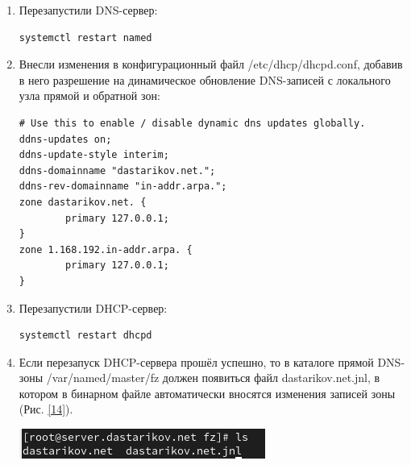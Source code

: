 \begin{enumerate}
\item Перезапустили DNS-сервер:
    \begin{verbatim}
systemctl restart named
    \end{verbatim}
\item Внесли изменения в конфигурационный файл /etc/dhcp/dhcpd.conf, добавив в него разрешение на динамическое обновление DNS-записей с локального узла прямой и обратной зон:
    \begin{verbatim}
# Use this to enable / disable dynamic dns updates globally.
ddns-updates on;
ddns-update-style interim;
ddns-domainname "dastarikov.net.";
ddns-rev-domainname "in-addr.arpa.";
zone dastarikov.net. {
        primary 127.0.0.1;
}
zone 1.168.192.in-addr.arpa. {
        primary 127.0.0.1;
}
    \end{verbatim}
\item Перезапустили DHCP-сервер:
    \begin{verbatim}
systemctl restart dhcpd
    \end{verbatim}
\item Если перезапуск DHCP-сервера прошёл успешно, то в каталоге прямой DNS-зоны /var/named/master/fz должен появиться файл dastarikov.net.jnl, в котором в бинарном файле автоматически вносятся изменения записей зоны (Рис. \ref{14}).

\begin{center}
    \centering
    \includegraphics[width=\textwidth]{../images/image14.png}
    \label{14}
\end{center}

\end{enumerate}

